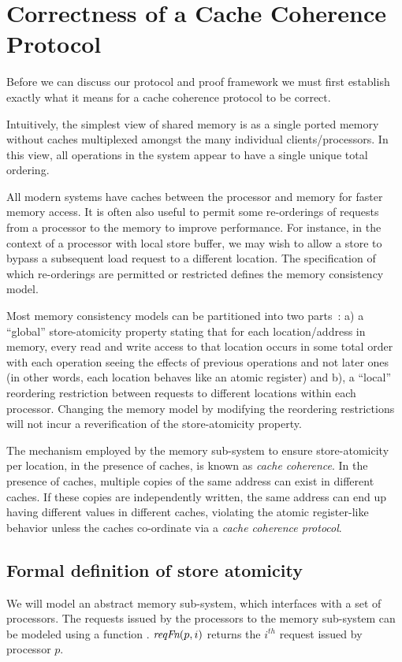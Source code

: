 \section{Correctness of a Cache Coherence Protocol}
\label{Sec:Background}

Before we can discuss our protocol and proof framework we must first establish
exactly what it means for a cache coherence protocol to be correct. 

Intuitively, the simplest view of shared memory is as a single ported memory
without caches multiplexed amongst the many individual clients/processors. In
this view, all operations in the system appear to have a single unique total
ordering.

All modern systems have caches between the processor and memory for faster
memory access.  It is often also useful to permit some re-orderings of requests
from a processor to the memory to improve performance.  For instance, in the
context of a processor with local store buffer, we may wish to allow a store to
bypass a subsequent load request to a different location. The specification of
which re-orderings are permitted or restricted defines the memory consistency
model.

Most memory consistency models can be partitioned into two
parts~\cite{Arvind-memory-model}: a) a ``global'' store-atomicity property
stating that for each location/address in memory, every read and write access
to that location occurs in some total order with each operation seeing the
effects of previous operations and not later ones (in other words, each
location behaves like an atomic register) and b), a ``local'' reordering
restriction between requests to different locations within each processor.
Changing the memory model by modifying the reordering restrictions will not
incur a reverification of the store-atomicity property.

The mechanism employed by the memory sub-system to ensure store-atomicity per
location, in the presence of caches, is known as \emph{cache coherence}. In the
presence of caches, multiple copies of the same address can exist in different
caches. If these copies are independently written, the same address can end up
having different values in different caches, violating the atomic register-like
behavior unless the caches co-ordinate via a \emph{cache coherence protocol}.

\subsection{Formal definition of store atomicity}
We will model an abstract memory sub-system, which interfaces with a set of
processors. The requests issued by the processors to the memory sub-system can
be modeled using a function \reqFn. $\textit{reqFn}(p, i)$ returns the $i^{th}$ request
issued by processor $p$.

